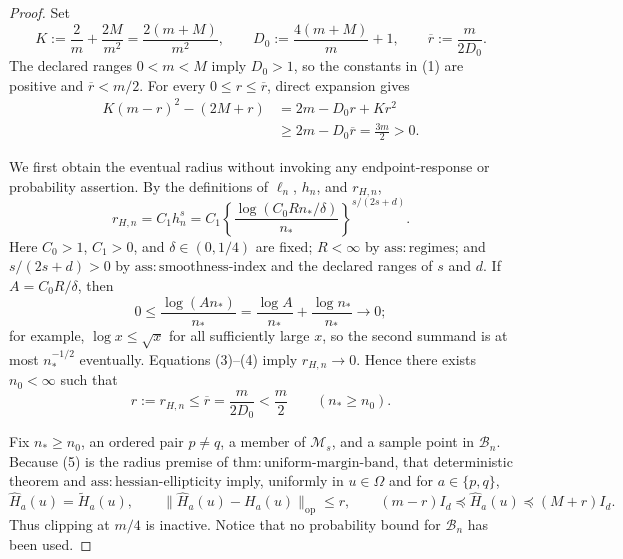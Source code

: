 \documentclass{article}
\begin{document}
\begin{proof}
Set
\[
 K:=\frac{2}{m}+\frac{2M}{m^2}=\frac{2(m+M)}{m^2},
 \qquad
 D_0:=\frac{4(m+M)}{m}+1,
 \qquad
 \overline r:=\frac{m}{2D_0}.
 \tag{1}
\]
The declared ranges \(0<m<M\) imply \(D_0>1\), so the constants in (1) are positive and \(\overline r<m/2\).  For every \(0\le r\le\overline r\), direct expansion gives
\[
 \begin{aligned}
 K(m-r)^2-(2M+r)
 &=2m-D_0r+Kr^2\\
 &\ge 2m-D_0\overline r
 =\frac{3m}{2}>0.
 \end{aligned}
 \tag{2}
\]

We first obtain the eventual radius without invoking any endpoint-response or probability assertion.  By the definitions of \(\ell_n\), \(h_n\), and \(r_{H,n}\),
\[
 r_{H,n}=C_1h_n^s
 =C_1\left\{\frac{\log(C_0Rn_\ast/\delta)}{n_\ast}\right\}^{s/(2s+d)}.
 \tag{3}
\]
Here \(C_0>1\), \(C_1>0\), and \(\delta\in(0,1/4)\) are fixed; \(R<\infty\) by \(\mathrm{ass:regimes}\); and \(s/(2s+d)>0\) by \(\mathrm{ass:smoothness\text{-}index}\) and the declared ranges of \(s\) and \(d\).  If \(A=C_0R/\delta\), then
\[
 0\le \frac{\log(An_\ast)}{n_\ast}
 =\frac{\log A}{n_\ast}+\frac{\log n_\ast}{n_\ast}
 \longrightarrow0;
 \tag{4}
\]
for example, \(\log x\le\sqrt{x}\) for all sufficiently large \(x\), so the second summand is at most \(n_\ast^{-1/2}\) eventually.  Equations (3)--(4) imply \(r_{H,n}\to0\).  Hence there exists \(n_0<\infty\) such that
\[
 r:=r_{H,n}\le\overline r=\frac{m}{2D_0}<\frac m2
 \qquad(n_\ast\ge n_0).
 \tag{5}
\]

Fix \(n_\ast\ge n_0\), an ordered pair \(p\ne q\), a member of \(\mathcal M_s\), and a sample point in \(\mathcal B_n\).  Because (5) is the radius premise of \(\mathrm{thm:uniform\text{-}margin\text{-}band}\), that deterministic theorem and \(\mathrm{ass:hessian\text{-}ellipticity}\) imply, uniformly in \(u\in\Omega\) and for \(a\in\{p,q\}\),
\[
 \widehat H_a(u)=\widetilde H_a(u),
 \qquad
 \lVert\widehat H_a(u)-H_a(u)\rVert_{\mathrm{op}}\le r,
 \qquad
 (m-r)I_d\preceq\widehat H_a(u)\preceq(M+r)I_d.
 \tag{6}
\]
Thus clipping at \(m/4\) is inactive.  Notice that no probability bound for \(\mathcal B_n\) has been used.


\end{proof}
\end{document}
